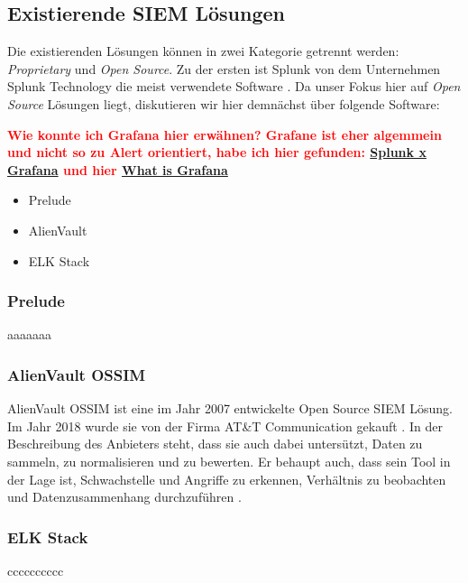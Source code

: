 \subsection{Existierende SIEM Lösungen}

Die existierenden  Lösungen können in zwei Kategorie getrennt werden: \textit{\gls{Proprietary}} und \textit{\gls{Open Source}}. Zu der ersten ist Splunk von dem Unternehmen Splunk Technology die meist verwendete Software \citep{Kazarov_Splunk}. Da unser Fokus hier auf \textit{\gls{Open Source}} Lösungen liegt, diskutieren wir hier demnächst über folgende Software:

\textbf{\textcolor{red}{Wie konnte ich Grafana hier erwähnen? Grafane ist eher algemmein und nicht so zu Alert orientiert, habe ich hier gefunden: \href{https://www.metricfire.com/blog/grafana-vs-splunk/}{Splunk x Grafana} und hier \href{https://www.researchgate.net/publication/350730340_Implementation_of_Grafana_as_open_source_visualization_and_query_processing_platform_for_data_scientists_and_researchers}{What is Grafana}}  }

\begin{itemize}[noitemsep]
   \item Prelude
   \item AlienVault
   \item ELK Stack
\end{itemize}

\subsubsection{Prelude}
aaaaaaa

\subsubsection{AlienVault OSSIM}
AlienVault OSSIM ist eine im Jahr 2007 entwickelte \gls{Open Source} SIEM Lösung. Im Jahr 2018 wurde sie von der Firma AT\&T Communication gekauft \citep{CBN_AV}. In der Beschreibung des Anbieters steht, dass sie auch dabei untersützt, Daten zu sammeln, zu normalisieren und zu bewerten. Er behaupt auch, dass sein Tool in der Lage ist, Schwachstelle und Angriffe zu erkennen, Verhältnis zu beobachten und Datenzusammenhang durchzuführen \citep{ATT_AVO}.

\subsubsection{ELK Stack}
cccccccccc

